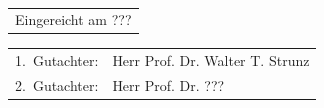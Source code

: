 \newpage
\thispagestyle{empty}
\ \vfill
\begin{tabular}{l}
Eingereicht am ???\\
\end{tabular}

\vspace{1cm}

\begin{tabular}{ll}
1.~Gutachter: & Herr Prof. Dr. Walter T. Strunz\\
2.~Gutachter: & Herr Prof. Dr. ???\\
\end{tabular}

\newpage
\thispagestyle{empty}
\section*{}
\section*{}
\tableofcontents
